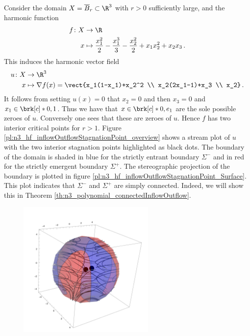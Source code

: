 \begin{example}
  \label{ex:n3_polynomial_defn}
  Consider the domain $X=\overline{B}_r\subset\R^3$ with $r>0$ sufficiently large, and the harmonic function
  \begin{align}
    \begin{aligned}
    f\colon X&\to\R \\
    x&\mapsto \frac{x_1^2}{2}-\frac{x_1^3}{3}-\frac{x_2^2}{2}+x_1x_2^2+x_2x_3\,.
    \end{aligned}
    \label{eq:n3_polynomial_defnf}
  \end{align}
  This induces the harmonic vector field
  \begin{align*}
    u\colon X&\to\R^3 \\
    x&\mapsto\nabla f(x)=\vect{x_1(1-x_1)+x_2^2 \\
      x_2(2x_1-1)+x_3 \\
      x_2}\,.
  \end{align*}
  It follows from setting $u(x)=0$ that $x_2=0$
  and then $x_3=0$ and $x_1\in\brk[c]*{0,1}$. Thus we have that $x\in\brk[c]*{0,e_1}$
  are the sole possible zeroes of $u$. Conversely one sees that these are zeroes of $u$.
  Hence $f$ has two interior critical points for $r>1$.
  Figure \ref{pl:n3_hf_inflowOutflowStagnationPoint_overview}
  shows a stream plot of $u$ with the two interior stagnation points highlighted as black dots.
  The boundary of the domain is shaded in blue for the strictly entrant boundary $\Sigma^-$ and in red 
  for the strictly emergent boundary $\Sigma^+$.
  The stereographic projection of the boundary is plotted in figure \ref{pl:n3_hf_inflowOutflowStagnationPoint_Surface}.
  This plot indicates that $\Sigma^-$ and $\Sigma^+$ are simply connected.
  Indeed, we will show this in Theorem \ref{th:n3_polynomial_connectedInflowOutflow}.
  \begin{figure}
    \centering
    \includegraphics[width=0.6\textwidth]{../plots/n3_hf_inflowOutflow_Ball_overview.pdf}

\end{figure}
\end{example}
